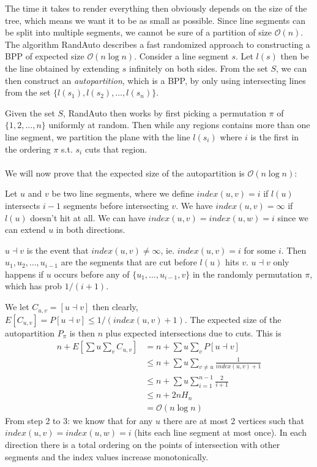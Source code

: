 \documentclass[a4paper]{article}
\begin{document}
The time it takes to render everything then obviously depends on the size of the tree, which means we want it to be as small as possible. Since line segments can be split into multiple segments, we cannot be sure of a partition of size $\mathcal{O}(n)$.\\

The algorithm RandAuto describes a fast randomized approach to constructing a BPP of expected size $\mathcal{O}(n\log n)$. Consider a line segment $s$. Let $l(s)$ then be the line obtained by extending $s$ infinitely on both sides. From the set $S$, we can then construct an \textit{autopartition}, which is a BPP, by only using intersecting lines from the set $\{l(s_1), l(s_2),\ldots,l(s_n)\}$.

Given the set $S$, RandAuto then works by first picking a permutation $\pi$ of $\{1,2,\ldots,n\}$ uniformly at random. Then while any regions contains more than one line segment, we partition the plane with the line $l(s_i)$ where $i$ is the first in the ordering $\pi$ s.t. $s_i$ cuts that region.\\
\\
We will now prove that the expected size of the autopartition is $\mathcal{O}(n\log n)$:

Let $u$ and $v$ be two line segments, where we define $index(u,v)=i$ if $l(u)$ intersects $i-1$ segments before intersecting $v$. We have $index(u,v)=\infty$ if $l(u)$ doesn't hit at all. We can have $index(u,v)=index(u,w)=i$ since we can extend $u$ in both directions.

$u \dashv v$ is the event that $index(u,v)\not = \infty$, ie. $index(u,v)=i$ for some $i$. Then $u_1,u_2,\ldots,u_{i-1}$ are the segments that are cut before $l(u)$ hits $v$. $u \dashv v$ only happens if $u$ occurs before any of $\{u_1,\ldots,u_{i-1},v\}$ in the randomly permutation $\pi$, which has prob $1/(i+1)$.

We let $C_{u,v}=[u\dashv v]$ then clearly, $E[C_{u,v}]=P[u\dashv v]\leq 1/(index(u,v)+1)$. The expected size of the autopartition $P_{\pi}$ is then $n$ plus expected intersections due to cuts. This is 
\begin{align*}
  n+E\left[\sum{u}\sum_{v}  C_{u,v} \right] &=    n+\sum{u}\sum_{v} P\left[ u \dashv v \right]\\
                                            &\leq n+\sum{u}\sum_{v\not = u}\frac{1}{index(u,v)+1}\\
                                            &\leq n+\sum{u}\sum_{i=1}^{n-1}\frac{2}{i+1}\\
                                            &\leq n+2nH_n\\
                                            &=    \mathcal{O}(n\log n)
\end{align*}
From step 2 to 3: we know that for any $u$ there are at most 2 vertices such that $index(u,v)=index(u,w)=i$ (hits each line segment at most once). In each direction there is a total ordering on the points of intersection with other segments and the index values increase monotonically.
\end{document}
